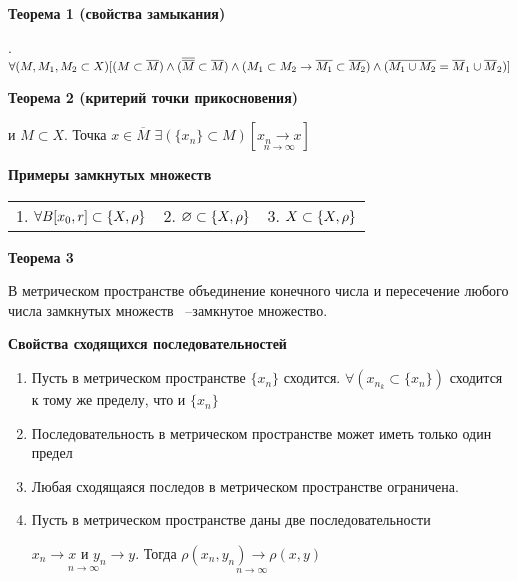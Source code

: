     \noindent\dotfill

\textbf{Теорема 1 (свойства замыкания) }

\MS. $\forall(M, M_1, M_2\subset X)[(M\subset \overline{M})
        \wedge \newline (\overline{\overline{M}}\subset \overline{M})
        \wedge (M_1 \subset M_2 \rightarrow \overline{M_1} \subset \overline{M_2})
        \wedge(\overline{M_1\cup M_2}=\overline M_1 \cup \overline M_2)]$

    \noindent\dotfill
    
\textbf{Теорема 2 (критерий точки прикосновения)}

\MS и $M \subset X$. Точка $x \in \overline M $ \tttk
$\exists( \{ x_n \} \subset M)[\underset{n \rightarrow \infty  }{x_n \rightarrow x}]$

\textbf{Примеры замкнутых множеств}

\begin{tabular}{c c c}
    1. $\forall B[x_0, r]\subset \{X, \rho\} $ &
    2. $\varnothing \subset \{X, \rho\} $      &
    3. $X \subset \{X, \rho\}$
\end{tabular}

\noindent\dotfill
    
\textbf{Теорема 3}

В метрическом пространстве объединение конечного числа и пересечение любого числа
замкнутых множеств ~--замкнутое множество.

\noindent\dotfill
    
\textbf{Свойства сходящихся последовательностей  }
\begin{enumerate}
    \item Пусть в метрическом пространстве $\{x_n\}$ сходится. $\forall(x_{n_k} \subset
              \{x_n \})$ сходится к тому же пределу, что и $\{x_n\}$
    \item Последовательность в метрическом пространстве может иметь только один
          предел
    \item Любая сходящаяся последов в метрическом пространстве ограничена.
    \item Пусть в метрическом пространстве даны две последовательности

          $\underset{n \rightarrow \infty  }{x_n \rightarrow x \text{ и } y_n \rightarrow y} $. Тогда
          $\underset{n \rightarrow \infty  }{\rho(x_n, y_n) \rightarrow \rho(x, y)}$
\end{enumerate}

\noindent\dotfill
    
